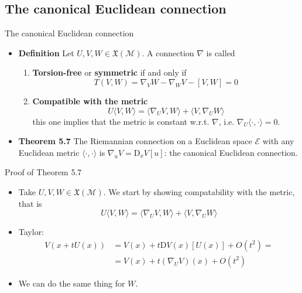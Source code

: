 \documentclass{beamer}
\begin{document}
\subsection{The canonical Euclidean connection}
\begin{frame}{The canonical Euclidean connection}
    \begin{itemize}
        \item \textbf{Definition} Let $U, V, W\in \mathfrak{X}(\mathcal{M})$. A connection $\nabla$ is called 
        \begin{enumerate}
            \item {\color{blue}\textbf{Torsion-free}} or {\color{blue}\textbf{symmetric}} if and only if 
            \begin{equation}
                T(V, W) = \nabla_V W - \nabla_W V - [V, W] = 0 
            \end{equation}
            \item {\color{blue}\textbf{Compatible with the metric}}
            \begin{equation}
                U\langle V, W\rangle = \langle \nabla_U V, W\rangle + \langle V, \nabla_U W \rangle 
            \end{equation}
            this one implies that the metric is constant w.r.t. $\nabla$, i.e. $\nabla_U \langle \cdot, \cdot\rangle = 0$. 
        \end{enumerate}
        \item \textbf{Theorem 5.7} The Riemannian connection on a Euclidean space $\mathcal{E}$ with any Euclidean metric $\langle \cdot, \cdot \rangle$ is $\nabla_u V = \text{D}_x V[u]$: the {\color{blue}canonical Euclidean connection}. 
    \end{itemize}
\end{frame}

\begin{frame}{Proof of Theorem 5.7}
    \begin{itemize}[<+->]
        \item Take $U, V, W \in \mathfrak{X}(\mathcal{M})$. We start by showing compatability with the metric, that is 
        \begin{equation}
            U\langle V, W\rangle = \langle \nabla_U V, W\rangle +\langle V, \nabla_U W\rangle
        \end{equation}
        \item Taylor: 
        \begin{align*}
            V(x+tU(x)) &= V(x) + t \text{D}V(x)[U(x)] + O(t^2) = \\
            &= V(x) + t(\nabla_U V)(x) + O(t^2 )
        \end{align*}
        \item We can do the same thing for $W$. 
    \end{itemize}
\end{frame}
\end{document}
